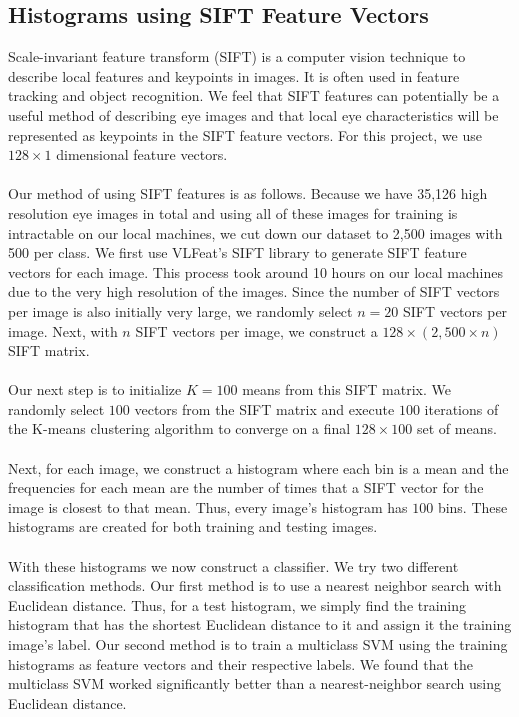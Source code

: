 \documentclass{article} %
\begin{document}
\subsection{Histograms using SIFT Feature Vectors}

Scale-invariant feature transform (SIFT) is a computer vision technique to describe local features and keypoints in images. It is often used in feature tracking and object recognition. We feel that SIFT features can potentially be a useful method of describing eye images and that local eye characteristics will be represented as keypoints in the SIFT feature vectors. For this project, we use $128 \times 1$ dimensional feature vectors.\\ \\
Our method of using SIFT features is as follows. Because we have 35,126 high resolution eye images in total and using all of these images for training is intractable on our local machines, we cut down our dataset to 2,500 images with 500 per class. We first use VLFeat's SIFT library to generate SIFT feature vectors for each image. This process took around 10 hours on our local machines due to the very high resolution of the images. Since the number of SIFT vectors per image is also initially very large, we randomly select $n=20$ SIFT vectors per image. Next, with $n$ SIFT vectors per image, we construct a $128 \times (2,500 \times n)$ SIFT matrix. \\ \\
Our next step is to initialize $K=100$ means from this SIFT matrix. We randomly select $100$ vectors from the SIFT matrix and execute $100$ iterations of the K-means clustering algorithm to converge on a final $128 \times 100$ set of means. \\ \\
Next, for each image, we construct a histogram where each bin is a mean and the frequencies for each mean are the number of times that a SIFT vector for the image is closest to that mean. Thus, every image's histogram has $100$ bins. These histograms are created for both training and testing images.\\ \\
With these histograms we now construct a classifier. We try two different classification methods. Our first method is to use a nearest neighbor search with Euclidean distance. Thus, for a test histogram, we simply find the training histogram that has the shortest Euclidean distance to it and assign it the training image's label. Our second method is to train a multiclass SVM using the training histograms as feature vectors and their respective labels. We found that the multiclass SVM worked significantly better than a nearest-neighbor search using Euclidean distance. \\ \\
\end{document}

